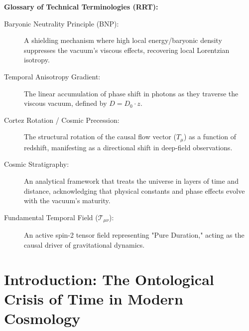 \documentclass[12pt,a4paper]{article}
\begin{document}
\vspace{0.4cm}

\begin{framed}
\small
\noindent \textbf{Glossary of Technical Terminologies (RRT):}
\begin{description}
    \item[Baryonic Neutrality Principle (BNP):] \raggedright A shielding mechanism where high local energy/baryonic density suppresses the vacuum's viscous effects, recovering local Lorentzian isotropy. \par
    \item[Temporal Anisotropy Gradient:] \raggedright The linear accumulation of phase shift in photons as they traverse the viscous vacuum, defined by $D = D_0 \cdot z$. \par
    \item[Cortez Rotation / Cosmic Precession:] The structural rotation of the causal flow vector ($T_\mu$) as a function of redshift, manifesting as a directional shift in deep-field observations.
    \item[Cosmic Stratigraphy:] An analytical framework that treats the universe in layers of time and distance, acknowledging that physical constants and phase effects evolve with the vacuum's maturity.
    \item[Fundamental Temporal Field ($\mathcal{T}_{\mu\nu}$):] An active spin-2 tensor field representing "Pure Duration," acting as the causal driver of gravitational dynamics.
\end{description}
\end{framed}

\vspace*{\fill} 

\newpage
\section{Introduction: The Ontological Crisis of Time in Modern Cosmology}
\end{document}
